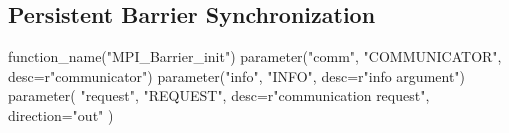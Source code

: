 
%





\subsection{Persistent Barrier Synchronization}
\label{sec:pcoll-barrier}

\begin{mpi-binding}
    function_name("MPI_Barrier_init")
    parameter("comm", "COMMUNICATOR", desc=r"communicator")
    parameter("info", "INFO", desc=r"info argument")
    parameter(
        "request", "REQUEST", desc=r"communication request", direction="out"
    )
\end{mpi-binding}

